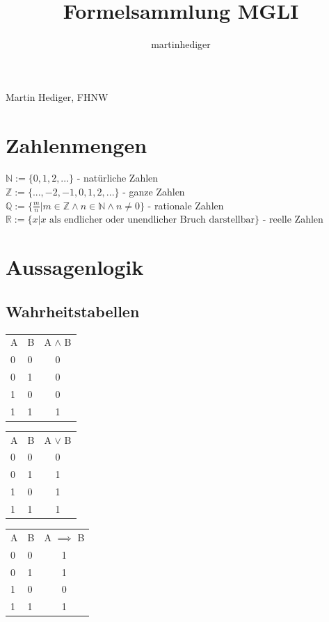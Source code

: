 \documentclass[8pt,landscape]{scrartcl}
\author{martinhediger}
\title{Formelsammlung MGLI}
\begin{document}
\setlength{\columnsep}{1cm}
\begin{multicols}{3}
Martin Hediger, FHNW



\section{Zahlenmengen}
$\mathbb{N} := \{0, 1, 2, ...\} $ - nat\"urliche Zahlen\\
$\mathbb{Z} := \{..., -2, -1, 0, 1, 2, ...\}$ - ganze Zahlen\\
$\mathbb{Q} := \{\frac{m}{n} | m \in \mathbb{Z} \land n \in \mathbb{N} \land n \neq 0 \}$ - rationale Zahlen\\
$\mathbb{R} := \{x | x \mbox{ als endlicher oder unendlicher Bruch darstellbar} \}$ - reelle Zahlen



\section{Aussagenlogik}

\subsection{Wahrheitstabellen}

\begin{tabular}{ll||c}
A & B & A $\land$ B  \\ \cline{1-3}
0 & 0 &           0  \\
0 & 1 &           0  \\
1 & 0 &           0  \\
1 & 1 &           1
\end{tabular}
\begin{tabular}{ll||c}
A & B & A $\lor$ B  \\ \cline{1-3}
0 & 0 &           0  \\
0 & 1 &           1  \\
1 & 0 &           1  \\
1 & 1 &           1
\end{tabular}
\begin{tabular}{ll||c}
A & B & A $\implies$ B  \\ \cline{1-3}
0 & 0 &           1  \\
0 & 1 &           1  \\
1 & 0 &           0  \\
1 & 1 &           1
\end{tabular}


\end{multicols}
\end{document}
